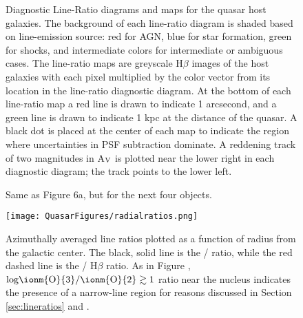 \begin{figure}%
\begin{center}
 \caption{Diagnostic Line-Ratio diagrams and maps for the quasar host galaxies.  The background of each line-ratio diagram is shaded based on line-emission source: red for AGN, blue for star formation, green for shocks, and intermediate colors for intermediate or ambiguous cases.  The line-ratio maps are greyscale H$\beta$ images of the host galaxies with each pixel multiplied by the color vector from its location in the line-ratio diagnostic diagram.  At the bottom of each line-ratio map a red line is drawn to indicate 1 arcsecond, and a green line is drawn to indicate 1 kpc at the distance of the quasar.  A black dot is placed at the center of each map to indicate the region where uncertainties in PSF subtraction dominate. A reddening track of two magnitudes in A$_{\rm V}$ is plotted near the lower right in each diagnostic diagram; the track points to the lower left.}
\label{fig:bpt}
\end{center}
\end{figure}

\begin{figure}%
\begin{center}
\ContinuedFloat
{}
 \caption{Same as Figure 6a, but for the next four objects.}
\label{fig:bpt}
\end{center}
\end{figure}


\begin{figure}%
\begin{center}
   \texttt{[image: QuasarFigures/radialratios.png]}
   \caption{Azimuthally averaged line ratios plotted as a function of radius from the galactic center.  The black, solid line is the  /  ratio, while the red dashed line is the  / H$\beta$ ratio. As in Figure , ${\rm log\ionm{O}{3}/\ionm{O}{2}\gtrsim 1}$ ratio near the nucleus indicates the presence of a narrow-line region for reasons discussed in Section \ref{sec:lineratios} and \cite{BPT}.}
\label{fig:azimuthallineratios}
\end{center}
\end{figure}

